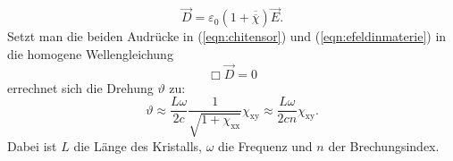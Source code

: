 \begin{equation}
  \label{eqn:efeldinmaterie}
  \vec{D}=\varepsilon_0\left(1+\overline{\overline{\chi}}\right)\vec{E}.
\end{equation}
Setzt man die beiden Audrücke in (\ref{eqn:chitensor}) und (\ref{eqn:efeldinmaterie}) in die homogene Wellengleichung
\begin{equation*}
  \Box \vec{D} = 0
\end{equation*}
errechnet sich die Drehung $\vartheta$ \cite[3-5]{Anleitung} zu:
\begin{equation}
  \label{eqn:drehungmitchi}
  \vartheta \approx \frac{L\omega}{2c} \frac{1}{\sqrt{1+\chi_\mathrm{xx}}} \chi_\mathrm{xy}\approx \frac{L\omega}{2cn} \chi_\mathrm{xy}.
\end{equation}
Dabei ist $L$ die Länge des Kristalls, $\omega$ die Frequenz und $n$ der Brechungsindex.
